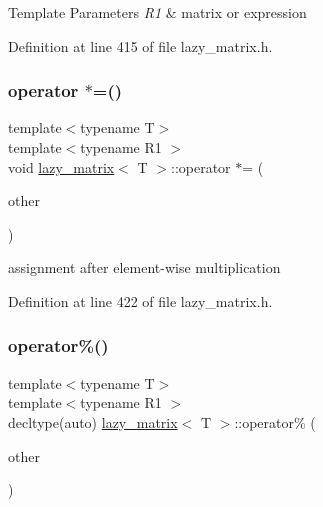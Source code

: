 \begin{DoxyTemplParams}{Template Parameters}
{\em R1} & matrix or expression \\
\hline
\end{DoxyTemplParams}


Definition at line 415 of file lazy\+\_\+matrix.\+h.

\mbox{\label{classlazy__matrix_a4299662cd5c146c7fd9b92cccf90467c}} 
\subsubsection{\texorpdfstring{operator $\ast$=()}{operator *=()}}
{\footnotesize\ttfamily template$<$typename T$>$ \\
template$<$typename R1 $>$ \\
void \mbox{\hyperlink{classlazy__matrix}{lazy\+\_\+matrix}}$<$ T $>$\+::operator $\ast$= (\begin{DoxyParamCaption}\item[{const R1 \&}]{other }\end{DoxyParamCaption})\hspace{0.3cm}{\ttfamily [inline]}}



assignment after element-\/wise multiplication 



Definition at line 422 of file lazy\+\_\+matrix.\+h.

\mbox{\label{classlazy__matrix_ad6086869ba1a16b7995804e8f3d53aff}} 
\subsubsection{\texorpdfstring{operator\%()}{operator\%()}}
{\footnotesize\ttfamily template$<$typename T$>$ \\
template$<$typename R1 $>$ \\
decltype(auto) \mbox{\hyperlink{classlazy__matrix}{lazy\+\_\+matrix}}$<$ T $>$\+::operator\% (\begin{DoxyParamCaption}\item[{const R1 \&}]{other }\end{DoxyParamCaption})\hspace{0.3cm}{\ttfamily [inline]}}



